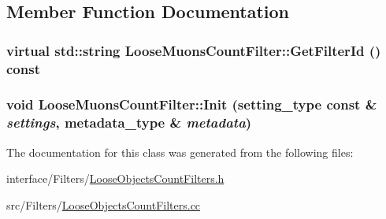 \subsection{Member Function Documentation}
\hypertarget{classLooseMuonsCountFilter_a557a83e2f449d46c65d7a1245c83fe20}{
\subsubsection[{GetFilterId}]{\setlength{\rightskip}{0pt plus 5cm}virtual std::string LooseMuonsCountFilter::GetFilterId () const}}
\label{classLooseMuonsCountFilter_a557a83e2f449d46c65d7a1245c83fe20}
\hypertarget{classLooseMuonsCountFilter_a494858cc791d4765dd421a36aafcd3ef}{
\subsubsection[{Init}]{\setlength{\rightskip}{0pt plus 5cm}void LooseMuonsCountFilter::Init (setting\_\-type const \& {\em settings}, \/  metadata\_\-type \& {\em metadata})}}
\label{classLooseMuonsCountFilter_a494858cc791d4765dd421a36aafcd3ef}


The documentation for this class was generated from the following files:\begin{DoxyCompactItemize}
\item 
interface/Filters/\hyperlink{LooseObjectsCountFilters_8h}{LooseObjectsCountFilters.h}\item 
src/Filters/\hyperlink{LooseObjectsCountFilters_8cc}{LooseObjectsCountFilters.cc}\end{DoxyCompactItemize}
